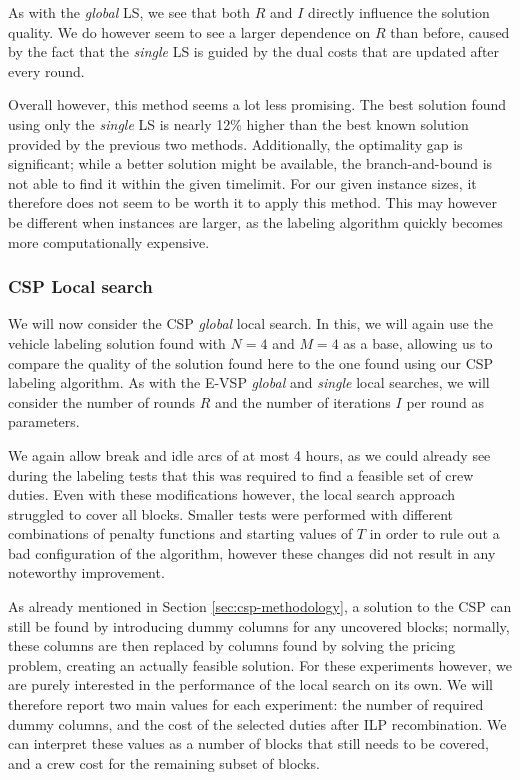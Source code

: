 \documentclass[]{article}
\begin{document}
As with the \emph{global} LS, we see that both $R$ and $I$ directly influence the solution quality. We do however seem to see a larger dependence on $R$ than before, caused by the fact that the \emph{single} LS is guided by the dual costs that are updated after every round.

Overall however, this method seems a lot less promising. The best solution found using only the \emph{single} LS is nearly 12\% higher than the best known solution provided by the previous two methods. Additionally, the optimality gap is significant; while a better solution might be available, the branch-and-bound is not able to find it within the given timelimit. For our given instance sizes, it therefore does not seem to be worth it to apply this method. This may however be different when instances are larger, as the labeling algorithm quickly becomes more computationally expensive. 

\subsubsection{CSP Local search}
We will now consider the CSP \emph{global} local search. In this, we will again use the vehicle labeling solution found with $N=4$ and $M=4$ as a base, allowing us to compare the quality of the solution found here to the one found using our CSP labeling algorithm. As with the E-VSP \emph{global} and \emph{single} local searches, we will consider the number of rounds $R$ and the number of iterations $I$ per round as parameters. 

We again allow break and idle arcs of at most 4 hours, as we could already see during the labeling tests that this was required to find a feasible set of crew duties. Even with these modifications however, the local search approach struggled to cover all blocks. Smaller tests were performed with different combinations of penalty functions and starting values of $T$ in order to rule out a bad configuration of the algorithm, however these changes did not result in any noteworthy improvement. 

As already mentioned in Section \ref{sec:csp-methodology}, a solution to the CSP can still be found by introducing dummy columns for any uncovered blocks; normally, these columns are then replaced by columns found by solving the pricing problem, creating an actually feasible solution. For these experiments however, we are purely interested in the performance of the local search on its own. We will therefore report two main values for each experiment: the number of required dummy columns, and the cost of the selected duties after ILP recombination. We can interpret these values as a number of blocks that still needs to be covered, and a crew cost for the remaining subset of blocks. 
\end{document}
